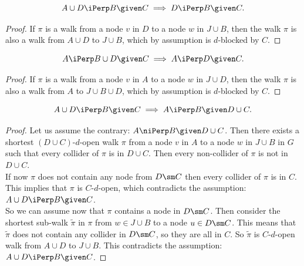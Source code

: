 \begin{Lem}
    \[ A \cup D \iPerp  B \given C \implies D \iPerp  B \given C.\]
\begin{proof}
If $\pi$ is a walk from a node $v$ in $D$ to a node $w$ in $J \cup B$, then 
the walk $\pi$ is also a walk from $A \cup D$ to $J \cup B$, which by assumption is $d$-blocked by $C$.
\end{proof}
\end{Lem}

\begin{Lem}
    \[ A \iPerp  B \cup D\given C  \implies A \iPerp  D \given C.\]
\begin{proof}
If $\pi$ is a walk from a node $v$ in $A$ to a node $w$ in $J \cup D$, then %
the walk  $\pi$ is also a walk from $A$ to $J \cup B \cup D$, which by assumption is $d$-blocked by $C$. 
\end{proof}
\end{Lem}

\begin{Lem}
    \label{d-sep-left-weak-union}
    \[A \cup D \iPerp  B  \given C \implies A \iPerp  B \given D\cup C.\]
\begin{proof}
    Let us assume the contrary:  $A \niPerp  B \given D\cup C$. Then there exists a shortest $(D \cup C)$-$d$-open walk $\pi$ 
    from a node $v$ in $A$ to a node $w$ in $J \cup B$ in $G$ such that every collider of $\pi$ is in $D \cup C$.
    Then every non-collider of $\pi$ is not in $D \cup C$.\\
    If now $\pi$ does not contain any node from $D \sm C$ then every collider of $\pi$ is in $C$. 
    This implies that $\pi$ is $C$-$d$-open, 
    which contradicts the assumption: $A \cup D \iPerp  B  \given C$.\\
    So we can assume now that $\pi$ contains a node in $D \sm C$. 
    Then consider the shortest sub-walk $\tilde \pi$ in 
    $\pi$ from $w \in J \cup B$ to a node $u \in D \sm C$. This means that $\tilde \pi$ does not contain any collider in $D\sm C$, 
    so they are all in $C$. So $\tilde \pi$ is $C$-$d$-open walk from $A \cup D$ to $J \cup B$. 
    This contradicts the assumption: $A \cup D \iPerp  B  \given C$.
\end{proof}
\end{Lem}

